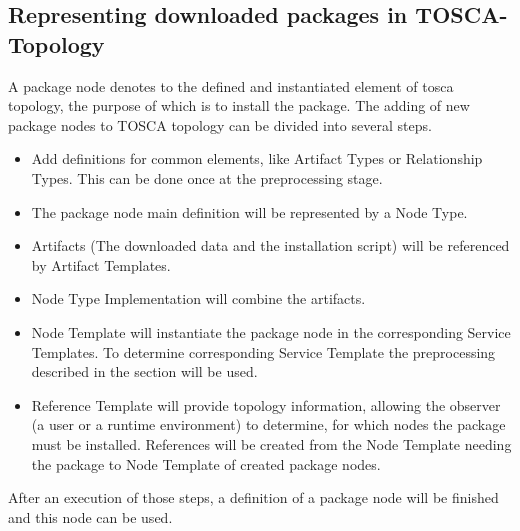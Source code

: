 \subsection{Representing downloaded packages in TOSCA-Topology} \label{subs:repres}
A package node denotes to the defined and instantiated element of \gls{tosca} topology, the purpose of which is to install the package.
The adding of new package nodes to TOSCA topology can be divided into several steps.
\begin{itemize}
	\item Add definitions for common elements, like Artifact Types or Relationship Types. 
		This can be done once at the preprocessing stage.
	\item The package node main definition will be represented by a Node Type. 
	\item Artifacts (The downloaded data and the installation script) will be referenced by Artifact Templates.
	\item Node Type Implementation will combine the artifacts.
	\item Node Template will instantiate the package node in the corresponding Service Templates.
		To determine corresponding Service Template the preprocessing described in the section  will be used.
	\item Reference Template will provide topology information, allowing the observer (a user or a runtime environment) to determine, for which nodes the package must be installed.
		References will be created from the Node Template needing the package to Node Template of created package nodes.
\end{itemize}
After an execution of those steps, a definition of a package node will be finished and this node can be used.
